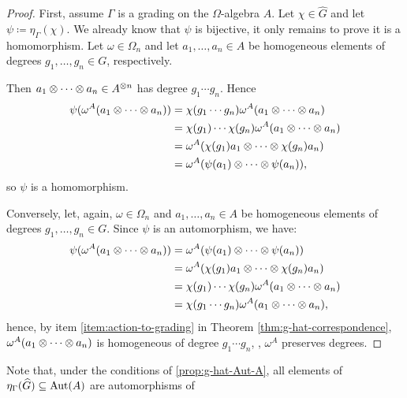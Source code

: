 \begin{proof}
	First, assume $\Gamma$ is a grading on the $\Omega$-algebra $A$.
	Let $\chi \in \widehat G$ and let $\psi \coloneqq \eta_\Gamma(\chi)$.
	We already know that $\psi$ is bijective, it only remains to prove it is a homomorphism.
	Let $\omega \in \Omega_n$ and let $a_1, \ldots, a_n \in A$ be homogeneous elements of degrees $g_1, \ldots, g_n \in G$, respectively.

	Then $a_1\otimes \cdots \otimes a_n \in A^{\otimes n}$ has degree $g_1 \cdots g_n$. Hence
	\begin{align*}
		\psi(\omega^A(a_1\otimes \cdots \otimes a_n)) & = \chi(g_1 \cdots g_n) \omega^A(a_1\otimes \cdots \otimes a_n)      \\
		                                              & =\chi(g_1) \cdots \chi(g_n) \omega^A(a_1\otimes \cdots \otimes a_n) \\
		                                              & = \omega^A(\chi(g_1)a_1\otimes \cdots \otimes \chi(g_n)a_n)         \\
		                                              & = \omega^A(\psi(a_1)\otimes \cdots \otimes \psi(a_n)),
	\end{align*}
	so $\psi$ is a homomorphism.

	Conversely, let, again, $\omega \in \Omega_n$ and $a_1, \ldots, a_n \in A$ be homogeneous elements of degrees $g_1, \ldots, g_n \in G$.
	Since $\psi$ is an automorphism, we have:
	\begin{align*}
		\psi(\omega^A(a_1\otimes \cdots \otimes a_n)) & = \omega^A(\psi(a_1)\otimes \cdots \otimes \psi(a_n))               \\
		                                              & = \omega^A(\chi(g_1)a_1\otimes \cdots \otimes \chi(g_n)a_n)         \\
		                                              & =\chi(g_1) \cdots \chi(g_n) \omega^A(a_1\otimes \cdots \otimes a_n) \\
		                                              & =\chi(g_1 \cdots g_n) \omega^A(a_1\otimes \cdots \otimes a_n),
	\end{align*}
	hence, by item \eqref{item:action-to-grading} in Theorem \ref{thm:g-hat-correspondence}, $\omega^A(a_1\otimes \cdots \otimes a_n)$ is homogeneous of degree $g_1 \cdots g_n$, \ie, $\omega^A$ preserves degrees.
\end{proof}

\begin{remark}
    Note that, under the conditions of \cref{prop:g-hat-Aut-A}, all elements of $\eta_\Gamma(\widehat G) \subseteq \operatorname{Aut}(A)$ are automorphisms of 
\end{remark}


